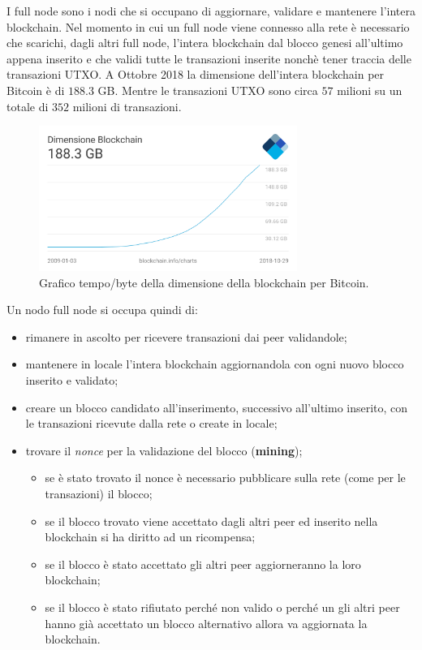 I full node sono i nodi che si occupano di aggiornare, validare e mantenere l'intera blockchain. Nel momento in cui un full node viene connesso alla rete è necessario che scarichi, dagli altri full node, l'intera blockchain dal blocco genesi all'ultimo appena inserito e che validi tutte le transazioni inserite nonchè tener traccia delle transazioni UTXO.\newline
A Ottobre 2018 la dimensione dell'intera blockchain per Bitcoin è di $188.3$ GB. Mentre le transazioni UTXO sono circa $57$ milioni su un totale di $352$ milioni di transazioni.
\begin{figure}[H]
    \centering
    \includegraphics[width=0.75\textwidth]{images/bcsize.png}
    \caption{Grafico tempo/byte della dimensione della blockchain per Bitcoin.}
\end{figure}
Un nodo full node si occupa quindi di:
\begin{itemize}
    \item rimanere in ascolto per ricevere transazioni dai peer validandole;
    \item mantenere in locale l'intera blockchain aggiornandola con ogni nuovo blocco inserito e validato;
    \item creare un blocco candidato all'inserimento, successivo all'ultimo inserito, con le transazioni ricevute dalla rete o create in locale;
    \item trovare il \textit{nonce} per la validazione del blocco (\textbf{mining});
    \begin{itemize}
        \item se è stato trovato il nonce è necessario pubblicare sulla rete (come per le transazioni) il blocco;
        \item se il blocco trovato viene accettato dagli altri peer ed inserito nella blockchain si ha diritto ad un ricompensa;
        \item se il blocco è stato accettato gli altri peer aggiorneranno la loro blockchain;
        \item se il blocco è stato rifiutato perché non valido o perché un gli altri peer hanno già accettato un blocco alternativo allora va aggiornata la blockchain.
    \end{itemize}
\end{itemize}
